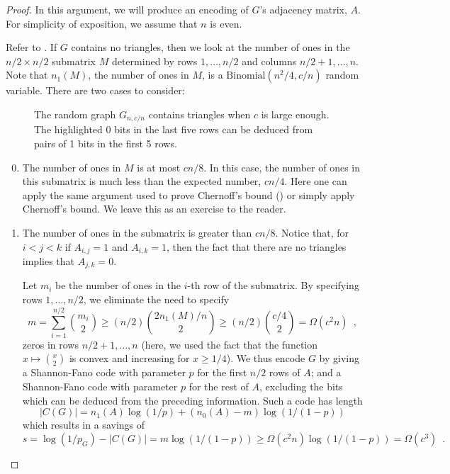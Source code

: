 \documentclass[prodmode,acmcsur]{acmsmall}
\begin{document}
\begin{proof}
  In this argument, we will produce an encoding of $G$'s adjacency
  matrix, $A$. For simplicity of exposition, we assume that $n$ is
  even.

  Refer to .  If $G$ contains no triangles, then we
  look at the number of ones in the $n/2\times n/2$ submatrix $M$
  determined by rows $1,\ldots,n/2$ and columns $n/2+1,\ldots,n$. Note
  that $n_1(M)$, the number of ones in $M$, is a
  $\mathrm{Binomial}(n^2/4, c/n)$ random variable.  There are two
  cases to consider:
  
  \begin{figure}
    \caption{The random graph $G_{n,c/n}$ contains triangles when $c$
      is large enough.  The highlighted 0 bits in the last five rows
      can be deduced from pairs of 1 bits in the first 5 rows.}
  \end{figure}

  \begin{enumerate}\setcounter{enumi}{-1}
  \item The number of ones in $M$ is at most $cn/8$.  In this case,
    the number of ones in this submatrix is much less than the
    expected number, $cn/4$.  Here one can apply the same argument
    used to prove Chernoff's bound () or simply apply
    Chernoff's bound. We leave this as an exercise to the reader.

  \item The number of ones in the submatrix is greater than $cn/8$.
    Notice that, for $i<j<k$ if $A_{i,j}=1$ and $A_{i,k}=1$, then the
    fact that there are no triangles implies that $A_{j,k}=0$.

    Let $m_i$ be the number of ones in the $i$-th row of the
    submatrix.  By specifying rows $1,\ldots,n/2$, we eliminate the
    need to specify
    \[
      m = \sum_{i=1}^{n/2}\binom{m_i}{2} \ge (n/2) \binom{2
        n_1(M)/n}{2} \ge (n/2)\binom{c/4}{2} = \varOmega(c^2n) \enspace ,
    \]
    zeros in rows $n/2+1,\ldots,n$ (here, we used the fact that the
    function $x \mapsto \binom{x}{2}$ is convex and increasing for $x \geq 1/4$).
    We thus encode $G$ by giving a
    Shannon-Fano code with parameter $p$ for the first $n/2$ rows of
    $A$; and a Shannon-Fano code with parameter $p$ for the rest of
    $A$, excluding the bits which can be deduced from the preceding
    information. Such a code has length
    \[
      |C(G)| = n_1(A) \log(1/p) + (n_0(A)-m)\log(1/(1-p))
    \]
    which results in a savings of
    \[
      s = \log(1/p_G) - |C(G)| = m\log(1/(1-p)) \ge
      \varOmega(c^2n)\log(1/(1-p)) = \varOmega(c^3) \enspace . %
    \]
  \end{enumerate}
\end{proof}
\end{document}
